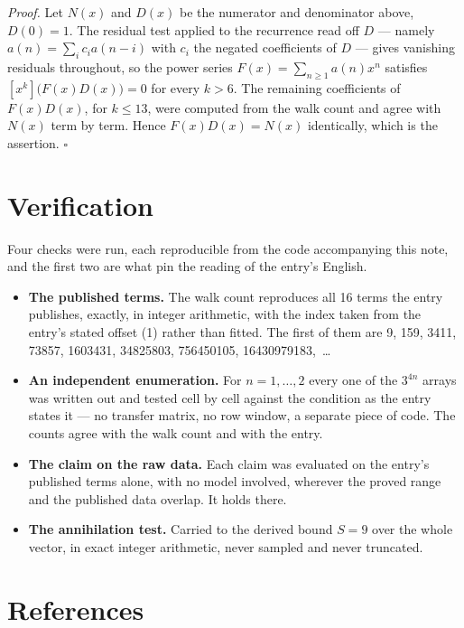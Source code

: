 \documentclass[11pt]{article}
\theoremstyle{definition}
\begin{document}
{\itshape Proof.} Let $N(x)$ and $D(x)$ be the numerator and denominator above, $D(0)=1$. The residual test applied to the recurrence read off $D$ --- namely $a(n) = \sum_i c_i a(n-i)$ with $c_i$ the negated coefficients of $D$ --- gives vanishing residuals throughout, so the power series $F(x)=\sum_{n\ge 1}a(n)x^n$ satisfies $[x^k]\bigl(F(x)D(x)\bigr) = 0$ for every $k > 6$. The remaining coefficients of $F(x)D(x)$, for $k \le 13$, were computed from the walk count and agree with $N(x)$ term by term. Hence $F(x)D(x) = N(x)$ identically, which is the assertion. $\square$

\section{Verification}

Four checks were run, each reproducible from the code accompanying this note, and the first two are what pin the reading of the entry's English.

\begin{itemize}

\item {\bfseries The published terms.} The walk count reproduces all 16 terms the entry publishes, exactly, in integer arithmetic, with the index taken from the entry's stated offset (1) rather than fitted. The first of them are 9, 159, 3411, 73857, 1603431, 34825803, 756450105, 16430979183,~\dots

\item {\bfseries An independent enumeration.} For $n = 1,\dots,2$ every one of the $3^{4n}$ arrays was written out and tested cell by cell against the condition as the entry states it --- no transfer matrix, no row window, a separate piece of code. The counts agree with the walk count and with the entry.

\item {\bfseries The claim on the raw data.} Each claim was evaluated on the entry's published terms alone, with no model involved, wherever the proved range and the published data overlap. It holds there.

\item {\bfseries The annihilation test.} Carried to the derived bound $S = 9$ over the whole vector, in exact integer arithmetic, never sampled and never truncated.

\end{itemize}

\section{References}
\end{document}
